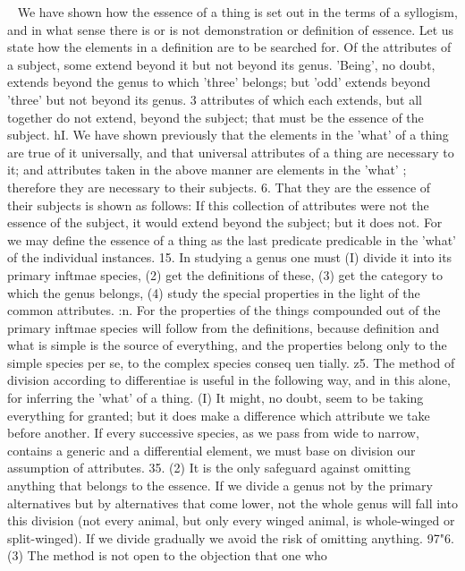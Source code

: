{{{{{{{{{{{{{{{{{{{{{{{{{{{{{{{{{{{{{{{{{{{{{{{{{{{{{{{{{{{{{{{~%
We have shown how the essence of a thing is set out
in the terms of a syllogism, and in what sense there is or is not
demonstration or definition of essence. Let us state how the
elements in a definition are to be searched for. Of the attributes
of a subject, some extend beyond it but not beyond its genus.
'Being', no doubt, extends beyond the genus to which 'three'
belongs; but 'odd' extends beyond 'three' but not beyond its
genus.
3%
attributes of which each extends, but all together do not extend,
beyond the subject; that must be the essence of the subject.
hI. We have shown previously that the elements in the 'what'
of a thing are true of it universally, and that universal attributes
of a thing are necessary to it; and attributes taken in the above
manner are elements in the 'what' ; therefore they are necessary
to their subjects.
6. That they are the essence of their subjects is shown as
follows: If this collection of attributes were not the essence of
the subject, it would extend beyond the subject; but it does not.
For we may define the essence of a thing as the last predicate
predicable in the 'what' of the individual instances.
15. In studying a genus one must (I) divide it into its primary
inftmae species, (2) get the definitions of these, (3) get the category
to which the genus belongs, (4) study the special properties in
the light of the common attributes.
:n. For the properties of the things compounded out of the
primary inftmae species will follow from the definitions, because
definition and what is simple is the source of everything, and the
properties belong only to the simple species per se, to the complex
species conseq uen tially.
z5. The method of division according to differentiae is useful
in the following way, and in this alone, for inferring the 'what' of
a thing. (I) It might, no doubt, seem to be taking everything
for granted; but it does make a difference which attribute we
take before another. If every successive species, as we pass
from wide to narrow, contains a generic and a differential element,
we must base on division our assumption of attributes.
35. (2) It is the only safeguard against omitting anything that
belongs to the essence. If we divide a genus not by the primary
alternatives but by alternatives that come lower, not the whole
genus will fall into this division (not every animal, but only every
winged animal, is whole-winged or split-winged). If we divide
gradually we avoid the risk of omitting anything.
97"6. (3) The method is not open to the objection that one who
}}}}}}}}}}}}}}}}}}}}}}}}}}}}}}}}}}}}}}}}}}}}}}}}}}}}}}}}}}}}}}}
